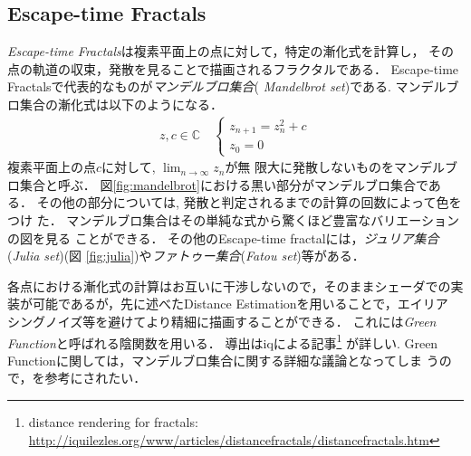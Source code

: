 \subsection{Escape-time Fractals}

{\it Escape-time Fractals}は複素平面上の点に対して，特定の漸化式を計算し，
その点の軌道の収束，発散を見ることで描画されるフラクタルである．
Escape-time Fractalsで代表的なものが\emph{マンデルブロ集合}({\it
Mandelbrot set})である.
マンデルブロ集合の漸化式は以下のようになる．
\begin{eqnarray*}
 z, c \in \mathbb{C} \quad
 \begin{cases}
  z_{n+1} = z^2_{n} + c \\ z_0 = 0
 \end{cases}
\end{eqnarray*}
複素平面上の点$c$に対して, $\displaystyle \lim_{n \to \infty} z_n$が無
限大に発散しないものをマンデルブロ集合と呼ぶ．
図\ref{fig:mandelbrot}における黒い部分がマンデルブロ集合である．
その他の部分については, 発散と判定されるまでの計算の回数によって色をつけ
た．
マンデルブロ集合はその単純な式から驚くほど豊富なバリエーションの図を見る
ことができる．
その他のEscape-time fractalには，\emph{ジュリア集合}({\it Julia set})(図
\ref{fig:julia})や\emph{ファトゥー集合}({\it Fatou set})等がある．

各点における漸化式の計算はお互いに干渉しないので，そのままシェーダでの実
装が可能であるが，先に述べたDistance Estimationを用いることで，エイリア
シングノイズ等を避けてより精細に描画することができる．
これには{\it Green Function}と呼ばれる陰関数を用いる．
導出はiqによる記事\footnote{distance rendering for fractals:
\url{http://iquilezles.org/www/articles/distancefractals/distancefractals.htm}}
が詳しい.
Green Functionに関しては，マンデルブロ集合に関する詳細な議論となってしま
うので，\cite{mandelbrot}を参考にされたい．

